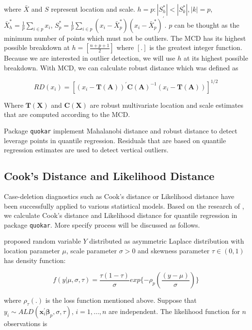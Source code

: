 \documentclass[11pt,a4paper,]{article}
\theoremstyle{definition}
\theoremstyle{definition}
\theoremstyle{remark}
\begin{document}
where \(\bar{X}\) and \(S\) represent location and scale.
\(h={p: |S^{*}_{h}|<|S^{*}_{k}|,|k|=p}\),
\(\bar{X}^{*}_{h}=\frac{1}{p}\sum_{i \in p}x_{i}\),
\(S^{*}_{p}=\frac{1}{p}\sum_{i \in p}(x_i-\bar{X}^{*}_{p})(x_i-\bar{X}^{*}_{p})^{'}\).
\(p\) can be thought as the minimum number of points which must not be
outliers. The MCD has its highest possible breakdown at
\(h=[\frac{n+p+1}{2}]\) where \([.]\) is the greatest integer function.
Because we are interested in outlier detection, we will use \(h\) at its
highest possible breakdown. With MCD, we can calculate robust distance
which was defined as

\begin{equation}
RD(x_i)=[(x_i-\boldsymbol{T(A)})^{'}\boldsymbol{C(A)}^{-1}(x_i-\boldsymbol{T(A)})]^{1/2}
\label{eq:rd}
\end{equation}

Where \(\boldsymbol{T(X)}\) and \(\boldsymbol{C(X)}\) are robust
multivariate location and scale estimates that are computed according to
the MCD.

Package \texttt{quokar} implement Mahalanobi distance and robust
distance to detect leverage points in quantile regression. Residuals
that are based on quantile regression estimates are used to detect
vertical outliers.

\subsection{Cook's Distance and Likelihood
Distance}\label{cooks-distance-and-likelihood-distance}

Case-deletion diagnostics such as Cook's distance or Likelihood distance
have been successfully applied to various statistical models. Based on
the research of \textcite{sanchez2013likelihood}, we calculate Cook's
distance and Likelihood distance for quantile regression in package
\texttt{quokar}. More specify process will be discussed as follows.

\textcite{yu2001bayesian} proposed random variable \(Y\) distributed as
asymmetric Laplace distribution with location parameter \(\mu\), scale
parameter \(\sigma >0\) and skewness parameter \(\tau \in (0,1)\) has
density function:

\begin{equation}
f(y|\mu, \sigma, \tau) = \frac{\tau (1-\tau)}{\sigma}exp\{-\rho_{p}(\frac{(y-\mu)}{\sigma})\}
\label{eq: ald}
\end{equation}

where \(\rho_{\tau}(.)\) is the loss function mentioned above. Suppose
that
\(y_i \sim ALD(\boldsymbol{x}^{'}_{i}\mathbf{\beta}_{p}, \sigma, \tau)\),
\(i=1,...,n\) are independent. The likelihood function for \(n\)
observations is
\end{document}
